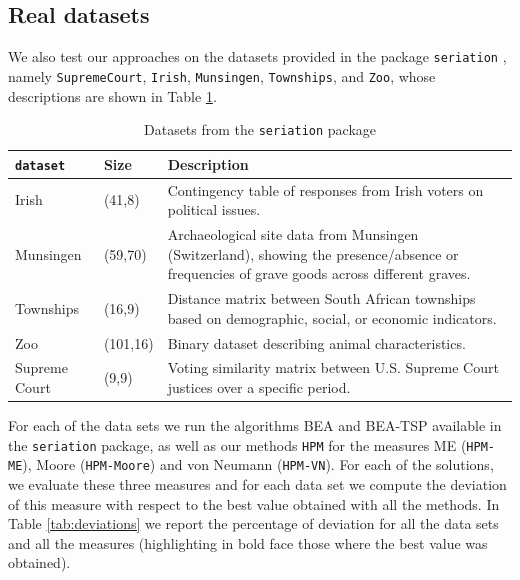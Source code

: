 \documentclass[a4paper,11pt, reqno]{amsart}
\begin{document}
\subsection{Real datasets}

\vspace*{0.2cm}


\vspace*{0.2cm}

We also test our approaches on the datasets provided in the package \texttt{seriation} \citep{hahsler2008getting}, namely \texttt{SupremeCourt}, \texttt{Irish}, \texttt{Munsingen}, \texttt{Townships}, and \texttt{Zoo}, whose descriptions are shown in Table \ref{table_dataR}.

\begin{table}[h!]
{\small\begin{tabular}{p{1.9cm}p{1.5cm}p{9.3cm}}
\texttt{dataset} & Size & Description\\\hline
Irish & (41,8) & Contingency table of responses from Irish voters on political issues.
\\
Munsingen & (59,70) & Archaeological site data from Munsingen (Switzerland), showing the presence/absence or frequencies of grave goods across different graves.\\
Townships & (16,9) & Distance matrix between South African townships based on demographic, social, or economic indicators.\\
Zoo & (101,16) &  Binary dataset describing animal characteristics.\\
Supreme Court & (9,9) &Voting similarity matrix between U.S. Supreme Court justices over a specific period.\\\hline
\end{tabular}}
\caption{Datasets from the \texttt{seriation} package\label{table_dataR}}
\end{table}

For each of the data sets we run the algorithms BEA and BEA-TSP available in the \texttt{seriation} package, as well as our methods \texttt{HPM} for the measures ME (\texttt{HPM-ME}), Moore (\texttt{HPM-Moore}) and von Neumann (\texttt{HPM-VN}). For each of the solutions, we evaluate these three measures and for each data set we compute the deviation of this measure with respect to the best value obtained with all the methods. In Table \ref{tab:deviations} we report the percentage of deviation for all the data sets and all the measures (highlighting in bold face those where the best value was obtained).
\end{document}
